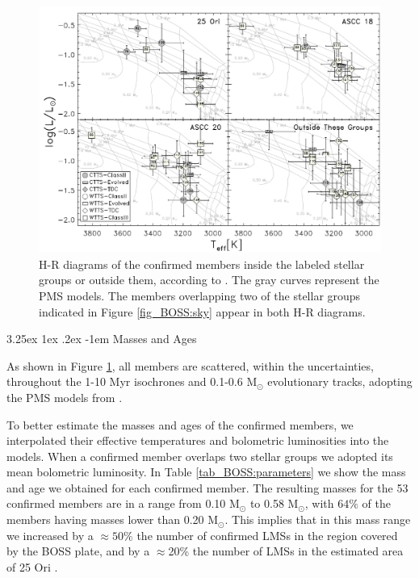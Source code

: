 \documentclass[12pt]{article}
\makeatletter
\renewcommand\paragraph{\@startsection{paragraph}{5}{\z@}%
  {3.25ex \@plus1ex \@minus.2ex}%
  {-1em}%
  {\normalfont\normalsize\bfseries}}
\makeatother
\begin{document}
\begin{figure}[ht!]
	\includegraphics[width=1.\textwidth]{f6.pdf}
	\caption[H-R diagram of the confirmed members from the BOSS spectra]{H-R diagrams of the confirmed members inside the labeled stellar groups or outside them, according to \citet{Kharchenko2013}. The gray curves represent the PMS \citet{Baraffe2015} models. The members overlapping two of the stellar groups indicated in Figure \ref{fig_BOSS:sky} appear in both H-R diagrams.
	\label{fig_BOSS:H-R}}
\end{figure}

\paragraph{Masses and Ages\\}

As shown in Figure \ref{fig_BOSS:H-R}, all members are scattered, within the uncertainties, throughout the 1-10 Myr isochrones and 0.1-0.6 M$_\odot$ evolutionary tracks, adopting the PMS models from \citet{Baraffe2015}.

To better estimate the masses and ages of the confirmed members, we interpolated their effective temperatures and bolometric luminosities into the \citet{Baraffe2015} models. When a confirmed member overlaps two stellar groups we adopted its mean bolometric luminosity. In Table \ref{tab_BOSS:parameters} we show the mass and age we obtained for each confirmed member. The resulting masses for the 53 confirmed members are in a range from 0.10 M$_\odot$ to 0.58 M$_\odot$, with $64\%$ of the members having masses lower than 0.20 M$_\odot$. This implies that in this mass range we increased by a $\approx50\%$ the number of confirmed LMSs in the region covered by the BOSS plate, and by a $\approx$20\% the number of LMSs in the estimated area of 25 Ori \citep[1$^\circ$ radius; ][]{Briceno2005,Briceno2007}.
\end{document}
